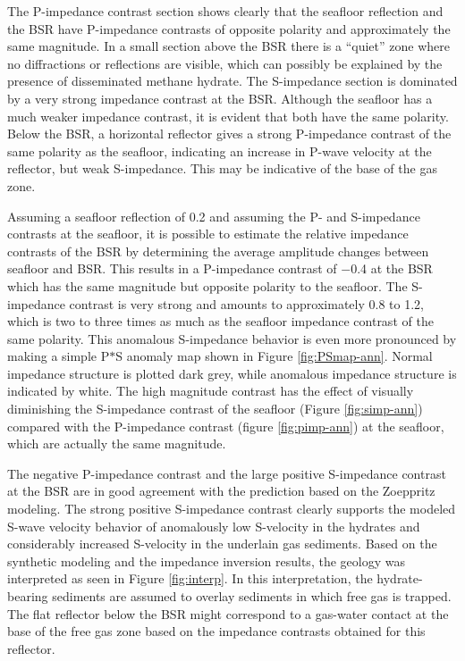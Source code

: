 The P-impedance contrast section shows clearly that the seafloor reflection 
and the BSR have P-impedance contrasts of opposite polarity and approximately
the same magnitude. In a small section above the BSR there is a ``quiet'' 
zone where no diffractions or reflections are visible, which can possibly 
be explained by the presence of disseminated methane hydrate. The 
S-impedance section is dominated by a very strong impedance contrast at the
BSR. Although the seafloor has a much weaker impedance contrast, it is evident 
that both have the same polarity. Below the BSR, a horizontal reflector gives
a strong P-impedance contrast of the same polarity as the seafloor, indicating
an increase in P-wave velocity at the reflector, but weak S-impedance. This may 
be indicative of the base of the gas zone.
\par
Assuming a seafloor reflection of 0.2 and assuming the P- and S-impedance 
contrasts at the seafloor, it is possible to estimate the relative impedance
contrasts of the BSR by determining the average amplitude changes between 
seafloor and BSR. This results in a P-impedance contrast of $-$0.4 at the
BSR which has the same magnitude but opposite polarity to the seafloor.
The S-impedance contrast is very strong and amounts to approximately 0.8
to 1.2, which is two to three times as much as the seafloor impedance 
contrast of the same polarity. This anomalous S-impedance behavior is even
more pronounced by making a simple P$*$S anomaly map shown in Figure 
\ref{fig:PSmap-ann}. Normal impedance structure is plotted dark grey, while
anomalous impedance structure is indicated by white. The high magnitude
contrast has the effect of visually diminishing the S-impedance contrast of
the seafloor (Figure \ref{fig:simp-ann})  compared with the P-impedance contrast
(figure \ref{fig:pimp-ann}) at the seafloor, which are actually the same magnitude.


The negative P-impedance contrast and the large positive S-impedance contrast
at the BSR are in good agreement with the prediction based on the Zoeppritz 
modeling. The strong positive S-impedance contrast clearly supports the modeled
S-wave velocity behavior of anomalously low S-velocity in the hydrates and 
considerably increased S-velocity in the underlain gas sediments. Based on 
the synthetic modeling and the impedance inversion results, the geology was
interpreted as seen in Figure \ref{fig:interp}. In this interpretation, the
hydrate-bearing sediments are assumed to overlay sediments in which free gas
is trapped. The flat reflector below the BSR might correspond to a gas-water
contact at the base of the free gas zone based on the impedance contrasts
obtained for this reflector.

